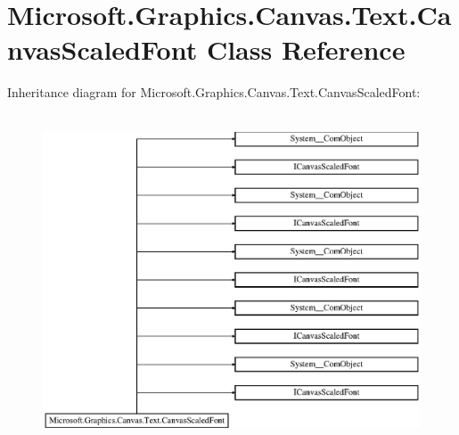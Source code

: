 \hypertarget{class_microsoft_1_1_graphics_1_1_canvas_1_1_text_1_1_canvas_scaled_font}{}\section{Microsoft.\+Graphics.\+Canvas.\+Text.\+Canvas\+Scaled\+Font Class Reference}
\label{class_microsoft_1_1_graphics_1_1_canvas_1_1_text_1_1_canvas_scaled_font}
Inheritance diagram for Microsoft.\+Graphics.\+Canvas.\+Text.\+Canvas\+Scaled\+Font\+:\begin{figure}[H]
\begin{center}
\leavevmode
\includegraphics[height=9.840256cm]{class_microsoft_1_1_graphics_1_1_canvas_1_1_text_1_1_canvas_scaled_font}
\end{center}
\end{figure}
